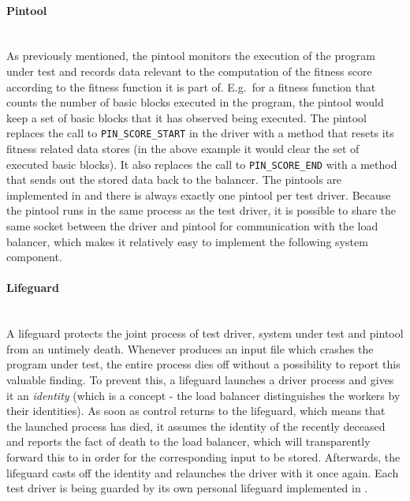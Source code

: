   \paragraph{Pintool} ~\\
  As previously mentioned, the pintool monitors the execution of the program under test and records
  data relevant to the computation of the fitness score according to the fitness function it is part of.
  E.g.\ for a fitness function that counts the number of basic blocks executed in the program, the pintool 
  would keep a set of basic blocks that it has observed being executed. The pintool replaces the call to 
  \texttt{PIN\_SCORE\_START} in the driver with a method that resets its fitness related data stores (in the 
  above example it would clear the set of executed basic blocks). It also replaces the call to
  \texttt{PIN\_SCORE\_END} with a method that sends out the stored data back to the balancer. 
  The pintools are implemented in \cpp and there is always exactly one pintool per test driver.
  Because the pintool runs in the same process as the test driver, it is possible to share the same \zmq
  socket between the driver and pintool for communication with the load balancer, which makes it relatively
  easy to implement the following system component.
  \paragraph{Lifeguard} ~\\
  A lifeguard protects the joint process of test driver, system under test and pintool from an untimely
  death. Whenever \xmlmate produces an input file which crashes the program under test, the entire process dies
  off without a possibility to report this valuable finding. To prevent this, a lifeguard launches a driver
  process and gives it an \emph{identity} (which is a \zmq concept - the load balancer distinguishes the
  workers by their identities). As soon as control returns to the lifeguard, which means that the launched
  process has died, it assumes the identity of the recently deceased and reports the fact of death to the load
  balancer, which will transparently forward this to \xmlmate in order for the corresponding input to be
  stored. Afterwards, the lifeguard casts off the identity and relaunches the driver with it once again.
  Each test driver is being guarded by its own personal lifeguard implemented in \python.
